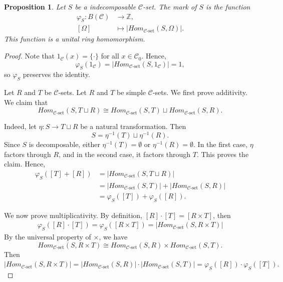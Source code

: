 \documentclass[a4paper]{article}
\newtheorem{prop}[thm]{Proposition}
\theoremstyle{definition}
\theoremstyle{remark}
\newcommand*{\cat}[1]{\mathcal{#1}}
\begin{document}
\begin{prop}\label{mark}
Let $S$ be a  indecomposable  $\cat{C}$-set. The \emph{mark} of $S$ is the function
\begin{align*}
    \varphi_S \colon B(\cat{C}) &\longrightarrow \mathbb{Z},\\
    [\Omega] &\longmapsto |Hom_{\cat{C}\text{-set}}(S,\Omega)|.
\end{align*}
This function is a unital ring homomorphism.
\end{prop}
\begin{proof}
Note that $1_{\cat{C}}(x)=\{ \cdot \}$ for all $x\in \cat{C}_0$. Hence,
\[
   \varphi_S(1_{\cat{C}})= |Hom_{\cat{C}\text{-set}}(S,1_{\cat{C}})| = 1,
\]
so $\varphi_S$ preserves the identity.

Let $R$ and $T$ be $\cat{C}$-sets. 
Let $R$ and $T$ be simple $\cat{C}$-sets. We first prove additivity. We claim that
\[
    Hom_{\cat{C}\text{-set}}(S, T \sqcup R) \cong Hom_{\cat{C}\text{-set}}(S,T) \sqcup Hom_{\cat{C}\text{-set}}(S,R).
\]

Indeed, let $\eta \colon S \to T \sqcup R$ be a natural transformation. Then
\[
    S = \eta^{-1}(T) \sqcup \eta^{-1}(R).
\]
Since $S$ is decomposable, either $\eta^{-1}(T) = \emptyset$ or $\eta^{-1}(R) = \emptyset$. In the first case, $\eta$ factors through $R$, and in the second case, it factors through $T$. This proves the claim. Hence,
\begin{align*}
    \varphi_S([T] + [R])
    &= |Hom_{\cat{C}\text{-set}}(S, T \sqcup R)| \\
    &= |Hom_{\cat{C}\text{-set}}(S,T)| + |Hom_{\cat{C}\text{-set}}(S,R)| \\
    &= \varphi_S([T]) + \varphi_S([R]).
\end{align*}



We now prove multiplicativity. By definition,
$[R]\cdot[T ]=[R\times T]$,  then
\begin{align*}
    \varphi_S([R]\cdot[T ])=\varphi_S([R\times T])=|Hom_{\cat{C}\text{-set}}(S,R\times T)|
\end{align*}
By the universal property of $\times$, we have $$Hom_{\cat{C}\text{-set}}(S,R\times T)\cong Hom_{\cat{C}\text{-set}}(S,R)\times Hom_{\cat{C}\text{-set}}(S,T).$$ Then $|Hom_{\cat{C}\text{-set}}(S,R\times T)|=|Hom_{\cat{C}\text{-set}}(S,R)|\cdot |Hom_{\cat{C}\text{-set}}(S,T)|=\varphi_S([R])\cdot \varphi_S([T]).$
    
\end{proof}
\end{document}
